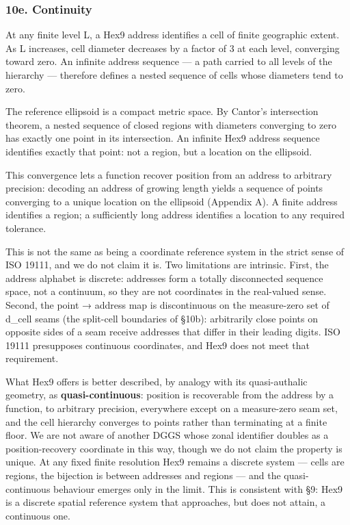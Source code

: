 \documentclass[
  11pt,
  a4paper,
]{article}
\begin{document}
\subsubsection{10e. Continuity}\label{e.-continuity}

At any finite level L, a Hex9 address identifies a cell of finite
geographic extent. As L increases, cell diameter decreases by a factor
of 3 at each level, converging toward zero. An infinite address sequence
--- a path carried to all levels of the hierarchy --- therefore defines
a nested sequence of cells whose diameters tend to zero.

The reference ellipsoid is a compact metric space. By Cantor's
intersection theorem, a nested sequence of closed regions with diameters
converging to zero has exactly one point in its intersection. An
infinite Hex9 address sequence identifies exactly that point: not a
region, but a location on the ellipsoid.

This convergence lets a function recover position from an address to
arbitrary precision: decoding an address of growing length yields a
sequence of points converging to a unique location on the ellipsoid
(Appendix A). A finite address identifies a region; a sufficiently long
address identifies a location to any required tolerance.

This is not the same as being a coordinate reference system in the
strict sense of ISO 19111, and we do not claim it is. Two limitations
are intrinsic. First, the address alphabet is discrete: addresses form a
totally disconnected sequence space, not a continuum, so they are not
coordinates in the real-valued sense. Second, the point → address map is
discontinuous on the measure-zero set of d\_cell seams (the split-cell
boundaries of §10b): arbitrarily close points on opposite sides of a
seam receive addresses that differ in their leading digits. ISO 19111
presupposes continuous coordinates, and Hex9 does not meet that
requirement.

What Hex9 offers is better described, by analogy with its quasi-authalic
geometry, as \textbf{quasi-continuous}: position is recoverable from the
address by a function, to arbitrary precision, everywhere except on a
measure-zero seam set, and the cell hierarchy converges to points rather
than terminating at a finite floor. We are not aware of another DGGS
whose zonal identifier doubles as a position-recovery coordinate in this
way, though we do not claim the property is unique. At any fixed finite
resolution Hex9 remains a discrete system --- cells are regions, the
bijection is between addresses and regions --- and the quasi-continuous
behaviour emerges only in the limit. This is consistent with §9: Hex9 is
a discrete spatial reference system that approaches, but does not
attain, a continuous one.
\end{document}
